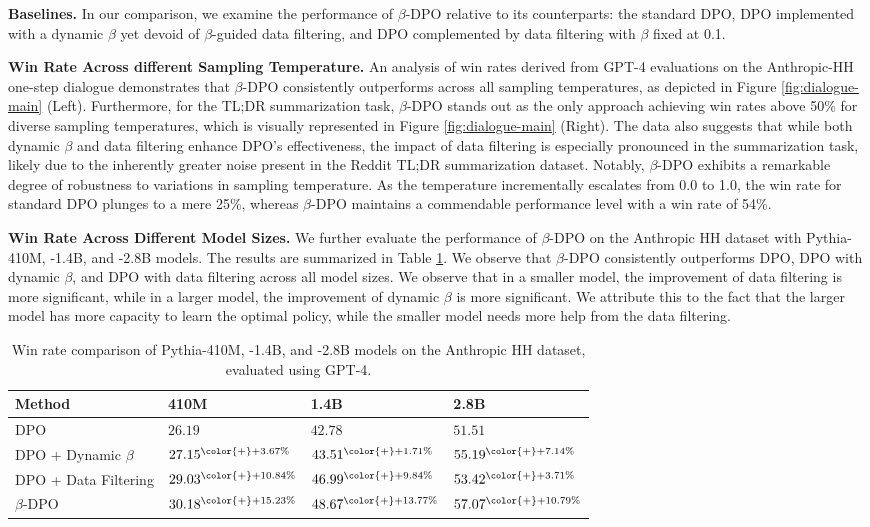 \textbf{Baselines.} In our comparison, we examine the performance of $\beta$-DPO relative to its counterparts: the standard DPO, DPO implemented with a dynamic $\beta$ yet devoid of $\beta$-guided data filtering, and DPO complemented by data filtering with $\beta$ fixed at 0.1.

\textbf{Win Rate Across different Sampling Temperature.} An analysis of win rates derived from GPT-4 evaluations on the Anthropic-HH one-step dialogue demonstrates that $\beta$-DPO consistently outperforms across all sampling temperatures, as depicted in Figure \ref{fig:dialogue-main} (Left). Furthermore, for the TL;DR summarization task, $\beta$-DPO stands out as the only approach achieving win rates above 50\% for diverse sampling temperatures, which is visually represented in Figure \ref{fig:dialogue-main} (Right). The data also suggests that while both dynamic $\beta$ and data filtering enhance DPO's effectiveness, the impact of data filtering is especially pronounced in the summarization task, likely due to the inherently greater noise present in the Reddit TL;DR summarization dataset. Notably, $\beta$-DPO exhibits a remarkable degree of robustness to variations in sampling temperature. As the temperature incrementally escalates from 0.0 to 1.0, the win rate for standard DPO plunges to a mere 25\%, whereas $\beta$-DPO maintains a commendable performance level with a win rate of 54\%.

\textbf{Win Rate Across Different Model Sizes.} We further evaluate the performance of $\beta$-DPO on the Anthropic HH dataset with Pythia-410M, -1.4B, and -2.8B models. The results are summarized in Table \ref{tab:ablation}. We observe that $\beta$-DPO consistently outperforms DPO, DPO with dynamic $\beta$, and DPO with data filtering across all model sizes.
We observe that in a smaller model, the improvement of data filtering is more significant, while in a larger model, the improvement of dynamic $\beta$ is more significant. We attribute this to the fact that the larger model has more capacity to learn the optimal policy, while the smaller model needs more help from the data filtering.

\begin{table}
    \centering
    \caption{
    Win rate comparison of Pythia-410M, -1.4B, and -2.8B models on the Anthropic HH dataset, evaluated using GPT-4.
    }
    \begin{tabular}{l|l|l|l}
        \toprule
        \textbf{Method} & \textbf{410M} & \textbf{1.4B} & \textbf{2.8B} \\
        \midrule
        DPO & $26.19$ & $42.78$ & $51.51$ \\
        DPO + Dynamic $\beta$ & $27.15^{\color{+}+ 3.67\%}$ & $43.51^{\color{+}+ 1.71\%}$ & $55.19^{\color{+}+ 7.14\%}$ \\
        DPO + Data Filtering & $29.03^{\color{+}+ 10.84\%}$ & $46.99^{\color{+}+ 9.84\%}$ & $53.42^{\color{+}+ 3.71\%}$ \\
        $\beta$-DPO & $30.18^{\color{+}+ 15.23\%}$ & $48.67^{\color{+}+ 13.77\%}$ & $57.07^{\color{+}+ 10.79\%}$ \\
        \bottomrule
    \end{tabular}
    \label{tab:ablation}
\end{table}

